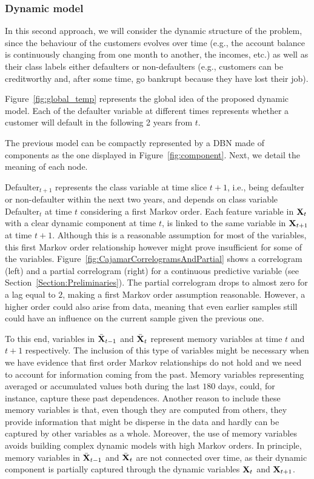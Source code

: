 \subsubsection*{Dynamic model} 

In this second approach, we will consider the dynamic structure of the problem, since the behaviour of the customers evolves over time (e.g., the account balance is continuously changing from one month to another, the incomes, etc.) as well as their class labels either defaulters or non-defaulters (e.g., customers can be creditworthy and, after some time, go bankrupt because they have lost their job). 

Figure~\ref{fig:global_temp} represents the global idea of the proposed dynamic model. Each of the defaulter variable at different times represents whether a customer will default in the following 2 years from $t$. 

The previous model can be compactly represented by a DBN made of components as the one displayed in 
Figure~\ref{fig:component}. Next, we detail the meaning of each node.

Defaulter$_{t+1}$ represents the class variable at time slice $t+1$, i.e., being defaulter or non-defaulter within the next two years, and depends on class variable Defaulter$_{t}$ at time $t$ considering a first Markov order. Each feature variable in ${\bf X}_t$ with a clear dynamic component at time $t$, is linked to the same variable in ${\bf X}_{t+1}$ at time $t+1$. Although this is a reasonable assumption for most of the variables, this first Markov order relationship however might prove insufficient for some of the variables. Figure~\ref{fig:CajamarCorrelogramsAndPartial} shows a correlogram (left) and a partial  correlogram (right) for a continuous predictive variable (see Section~\ref{Section:Preliminaries}). The partial correlogram drops to almost zero for a lag equal to $2$, making a first Markov order assumption reasonable. However, a higher order could also arise from data, meaning that even earlier samples still could have an influence on the current sample given the previous one. 

To this end, variables in $\bar{{\bf X}}_{t-1}$ and $\bar{\bf{X}}_{t}$ represent memory variables at time $t$ and $t+1$ respectively. The inclusion of this type of variables might be necessary when we have evidence that first order Markov relationships do not hold and we need to account for information coming from the past. Memory variables representing averaged or accumulated values both during the last $180$ days, could, for instance, capture these past dependences. Another reason to include these memory variables is that, even though they are computed from others, they provide information that might be disperse in the data and hardly can be captured by other variables as a whole. Moreover, the use of memory variables avoids building complex dynamic models with high Markov orders. In principle, memory variables in $\bar{{\bf X}}_{t-1}$ and $\bar{{\bf X}}_{t}$ are not connected over time, as their dynamic component is partially captured through the dynamic variables ${\bf X}_{t}$ and ${\bf X}_{t+1}$.


